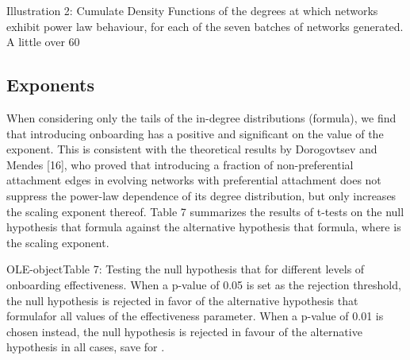 Illustration 2: Cumulate Density Functions of the degrees at which networks exhibit power law behaviour, for each of the seven batches of networks generated. A little over 60%

\subsection{Exponents}
When considering only the tails of the in-degree distributions (formula), we find that introducing onboarding has a positive and significant on the value of the exponent. This is consistent with the theoretical results by Dorogovtsev and Mendes [16], who proved that introducing a fraction of non-preferential attachment edges in evolving networks with preferential attachment does not suppress the power-law dependence of its degree distribution, but only increases the scaling exponent thereof. Table 7 summarizes the results of t-tests on the null hypothesis that formula against the alternative hypothesis that formula, where is the scaling exponent. 

OLE-objectTable 7: Testing the null hypothesis that   for different levels of onboarding effectiveness. When a p-value of 0.05 is set as the rejection threshold, the null hypothesis is rejected in favor of the alternative hypothesis that formulafor all values of the effectiveness parameter. When a p-value of 0.01 is chosen instead, the null hypothesis is rejected in favour of the alternative hypothesis in all cases, save for .